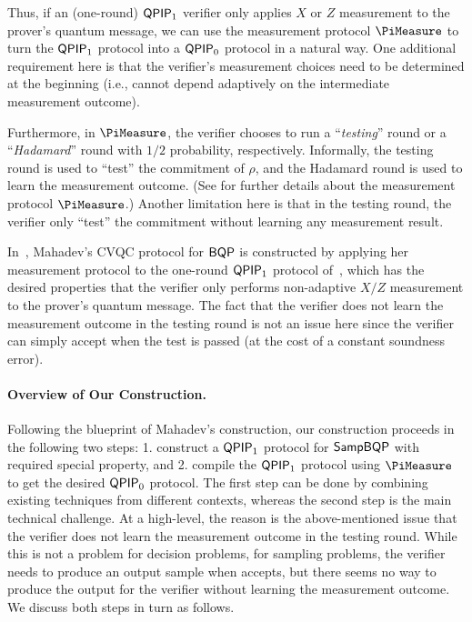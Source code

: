 Thus, if an (one-round) $\operatorname{\mathsf{QPIP}}_1$ verifier only applies $X$ or $Z$ measurement to the prover's quantum message, we can use the measurement protocol $\PiMeasure$ to turn the $\operatorname{\mathsf{QPIP}}_1$ protocol into a $\operatorname{\mathsf{QPIP}}_0$ protocol in a natural way. One additional requirement here is that the verifier's measurement choices need to be determined at the beginning (i.e., cannot depend adaptively on the intermediate measurement outcome). 

Furthermore, in $\PiMeasure$, the verifier chooses to run a ``\emph{testing}'' round or a ``\emph{Hadamard}'' round with $1/2$ probability, respectively. Informally, the testing round is used to ``test'' the commitment of $\rho$, and the Hadamard round is used to learn the measurement outcome. (See  for further details about the measurement protocol $\PiMeasure$.) Another limitation here is that in the testing round, the verifier only ``test'' the commitment without learning any measurement result. 

In~\cite{FOCS:Mahadev18a}, Mahadev's CVQC protocol for $\operatorname{\mathsf{BQP}}$ is constructed by applying her measurement protocol to the one-round $\operatorname{\mathsf{QPIP}}_1$ protocol of~\cite{PhysRevA.93.022326, mf16}, which has the desired properties that the verifier only performs non-adaptive $X/Z$ measurement to the prover's quantum message. The fact that the verifier does not learn the measurement outcome in the testing round is not an issue here since the verifier can simply accept when the test is passed (at the cost of a constant soundness error).

\paragraph{Overview of Our Construction.}
Following the blueprint of Mahadev's construction, our construction proceeds in the following two steps: 1. construct a $\operatorname{\mathsf{QPIP}}_1$ protocol for $\operatorname{\mathsf{SampBQP}}$ with required special property, and 2. compile the $\operatorname{\mathsf{QPIP}}_1$ protocol using $\PiMeasure$ to get the desired $\operatorname{\mathsf{QPIP}}_0$ protocol. The first step can be done by combining existing techniques from different contexts, whereas the second step is the main technical challenge.
At a high-level, the reason is the above-mentioned issue that the verifier does not learn the measurement outcome in the testing round. While this is not a problem for decision problems, %
for sampling problems, the verifier needs to produce an output sample when accepts, but there seems no way to produce the output for the verifier without learning the measurement outcome.   
%
We discuss both steps in turn as follows.

